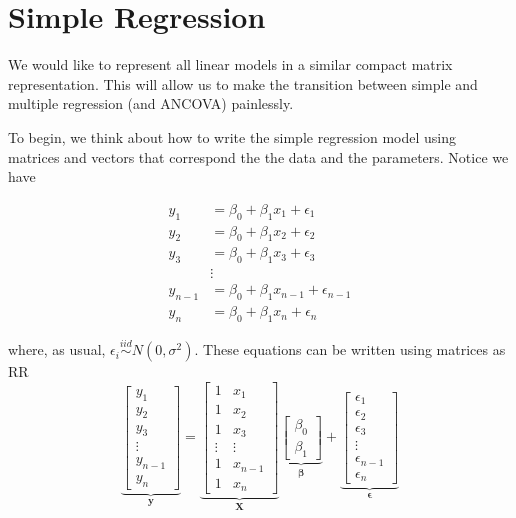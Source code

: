\documentclass[]{book}
\theoremstyle{definition}
\theoremstyle{definition}
\theoremstyle{remark}
\begin{document}
\section{Simple Regression}\label{simple-regression}

We would like to represent all linear models in a similar compact matrix
representation. This will allow us to make the transition between simple
and multiple regression (and ANCOVA) painlessly.

To begin, we think about how to write the simple regression model using
matrices and vectors that correspond the the data and the parameters.
Notice we have

\[\begin{aligned}
y_{1} & =  \beta_{0}+\beta_{1}x_{1}+\epsilon_{1}\\
y_{2} & =  \beta_{0}+\beta_{1}x_{2}+\epsilon_{2}\\
y_{3} & =  \beta_{0}+\beta_{1}x_{3}+\epsilon_{3}\\
 & \vdots\\
y_{n-1} & =  \beta_{0}+\beta_{1}x_{n-1}+\epsilon_{n-1}\\
y_{n} & =  \beta_{0}+\beta_{1}x_{n}+\epsilon_{n}
\end{aligned}\]

where, as usual,
\(\epsilon_{i}\stackrel{iid}{\sim}N\left(0,\sigma^{2}\right)\). These
equations can be written using matrices as RR \[
\underset{\boldsymbol{y}}{\underbrace{\left[\begin{array}{c}
y_{1}\\
y_{2}\\
y_{3}\\
\vdots\\
y_{n-1}\\
y_{n}
\end{array}\right]}}=\underset{\boldsymbol{X}}{\underbrace{\left[\begin{array}{cc}
1 & x_{1}\\
1 & x_{2}\\
1 & x_{3}\\
\vdots & \vdots\\
1 & x_{n-1}\\
1 & x_{n}
\end{array}\right]}}\underset{\boldsymbol{\beta}}{\underbrace{\left[\begin{array}{c}
\beta_{0}\\
\beta_{1}
\end{array}\right]}}+\underset{\boldsymbol{\epsilon}}{\underbrace{\left[\begin{array}{c}
\epsilon_{1}\\
\epsilon_{2}\\
\epsilon_{3}\\
\vdots\\
\epsilon_{n-1}\\
\epsilon_{n}
\end{array}\right]}}
\]
\end{document}
